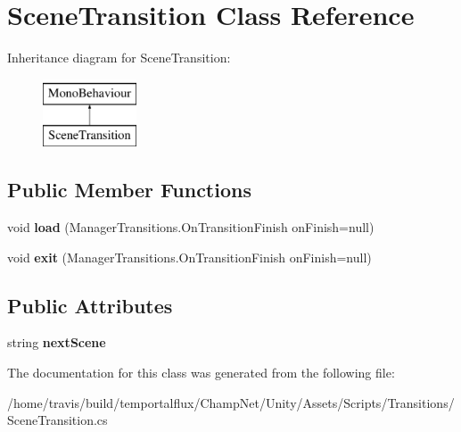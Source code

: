 \hypertarget{class_scene_transition}{\section{Scene\-Transition Class Reference}
\label{class_scene_transition}
}
Inheritance diagram for Scene\-Transition\-:\begin{figure}[H]
\begin{center}
\leavevmode
\includegraphics[height=2.000000cm]{class_scene_transition}
\end{center}
\end{figure}
\subsection*{Public Member Functions}
\begin{DoxyCompactItemize}
\item 
\hypertarget{class_scene_transition_ac0f7927206a866304c59c6f9d64db781}{void {\bfseries load} (Manager\-Transitions.\-On\-Transition\-Finish on\-Finish=null)}\label{class_scene_transition_ac0f7927206a866304c59c6f9d64db781}

\item 
\hypertarget{class_scene_transition_a1c56080a413a75527ecc5aaea65d5897}{void {\bfseries exit} (Manager\-Transitions.\-On\-Transition\-Finish on\-Finish=null)}\label{class_scene_transition_a1c56080a413a75527ecc5aaea65d5897}

\end{DoxyCompactItemize}
\subsection*{Public Attributes}
\begin{DoxyCompactItemize}
\item 
\hypertarget{class_scene_transition_a38658b7f48d29d07b9d79a9b77bbb4ee}{string {\bfseries next\-Scene}}\label{class_scene_transition_a38658b7f48d29d07b9d79a9b77bbb4ee}

\end{DoxyCompactItemize}


The documentation for this class was generated from the following file\-:\begin{DoxyCompactItemize}
\item 
/home/travis/build/temportalflux/\-Champ\-Net/\-Unity/\-Assets/\-Scripts/\-Transitions/Scene\-Transition.\-cs\end{DoxyCompactItemize}
